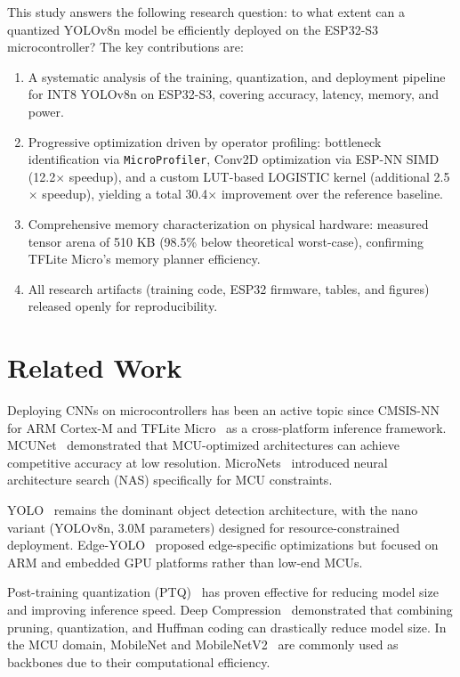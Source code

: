 \documentclass[10pt,twocolumn]{article}
\begin{document}
This study answers the following research question: to what extent can a quantized YOLOv8n model be efficiently deployed on the ESP32-S3 microcontroller? The key contributions are:

\begin{enumerate}
  \item A systematic analysis of the training, quantization, and deployment pipeline for INT8 YOLOv8n on ESP32-S3, covering accuracy, latency, memory, and power.
  \item Progressive optimization driven by operator profiling: bottleneck identification via \texttt{MicroProfiler}, Conv2D optimization via ESP-NN SIMD (12.2$\times$ speedup), and a custom LUT-based LOGISTIC kernel (additional 2.5$\times$ speedup), yielding a total 30.4$\times$ improvement over the reference baseline.
  \item Comprehensive memory characterization on physical hardware: measured tensor arena of 510 KB (98.5\% below theoretical worst-case), confirming TFLite Micro's memory planner efficiency.
  \item All research artifacts (training code, ESP32 firmware, tables, and figures) released openly for reproducibility.
\end{enumerate}

\section{Related Work}
\label{sec:related}

Deploying CNNs on microcontrollers has been an active topic since CMSIS-NN~\cite{cmsisnn} for ARM Cortex-M and TFLite Micro~\cite{tflitemicro} as a cross-platform inference framework. MCUNet~\cite{mcunet} demonstrated that MCU-optimized architectures can achieve competitive accuracy at low resolution. MicroNets~\cite{micronets} introduced neural architecture search (NAS) specifically for MCU constraints.

YOLO~\cite{yolov1,yolov3,yolov4,ultralytics} remains the dominant object detection architecture, with the nano variant (YOLOv8n, 3.0M parameters) designed for resource-constrained deployment. Edge-YOLO~\cite{edgeyolo} proposed edge-specific optimizations but focused on ARM and embedded GPU platforms rather than low-end MCUs.

Post-training quantization (PTQ)~\cite{jacob2018,krishnamoorthi2018,gholami2021survey} has proven effective for reducing model size and improving inference speed. Deep Compression~\cite{deepcompression} demonstrated that combining pruning, quantization, and Huffman coding can drastically reduce model size. In the MCU domain, MobileNet and MobileNetV2~\cite{mobilenets,mobilenetv2} are commonly used as backbones due to their computational efficiency.
\end{document}
